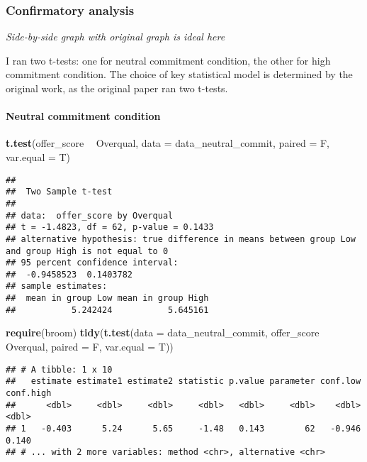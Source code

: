 \documentclass[]{article}
\newenvironment{Shaded}{\begin{snugshade}}{\end{snugshade}}
\newcommand{\DataTypeTok}[1]{\textcolor[rgb]{0.13,0.29,0.53}{#1}}
\newcommand{\KeywordTok}[1]{\textcolor[rgb]{0.13,0.29,0.53}{\textbf{#1}}}
\newcommand{\NormalTok}[1]{#1}
\newcommand{\OperatorTok}[1]{\textcolor[rgb]{0.81,0.36,0.00}{\textbf{#1}}}
\newcommand{\StringTok}[1]{\textcolor[rgb]{0.31,0.60,0.02}{#1}}
\let\oldparagraph\paragraph
\renewcommand{\paragraph}[1]{\oldparagraph{#1}\mbox{}}
\begin{document}
\hypertarget{confirmatory-analysis}{%
\subsubsection{Confirmatory analysis}\label{confirmatory-analysis}}

\emph{Side-by-side graph with original graph is ideal here}

I ran two t-tests: one for neutral commitment condition, the other for
high commitment condition. The choice of key statistical model is
determined by the original work, as the original paper ran two t-tests.

\hypertarget{neutral-commitment-condition}{%
\paragraph{Neutral commitment
condition}\label{neutral-commitment-condition}}

\begin{Shaded}
\begin{Highlighting}[]
\KeywordTok{t.test}\NormalTok{(offer_score }\OperatorTok{~}\StringTok{ }\NormalTok{Overqual, }\DataTypeTok{data =}\NormalTok{ data_neutral_commit, }\DataTypeTok{paired =}\NormalTok{ F, }\DataTypeTok{var.equal =}\NormalTok{ T)}
\end{Highlighting}
\end{Shaded}

\begin{verbatim}
## 
##  Two Sample t-test
## 
## data:  offer_score by Overqual
## t = -1.4823, df = 62, p-value = 0.1433
## alternative hypothesis: true difference in means between group Low and group High is not equal to 0
## 95 percent confidence interval:
##  -0.9458523  0.1403782
## sample estimates:
##  mean in group Low mean in group High 
##           5.242424           5.645161
\end{verbatim}

\begin{Shaded}
\begin{Highlighting}[]
\KeywordTok{require}\NormalTok{(broom)}
\KeywordTok{tidy}\NormalTok{(}\KeywordTok{t.test}\NormalTok{(}\DataTypeTok{data =}\NormalTok{ data_neutral_commit, offer_score }\OperatorTok{~}\StringTok{ }\NormalTok{Overqual, }\DataTypeTok{paired =}\NormalTok{ F, }\DataTypeTok{var.equal =}\NormalTok{ T))}
\end{Highlighting}
\end{Shaded}

\begin{verbatim}
## # A tibble: 1 x 10
##   estimate estimate1 estimate2 statistic p.value parameter conf.low conf.high
##      <dbl>     <dbl>     <dbl>     <dbl>   <dbl>     <dbl>    <dbl>     <dbl>
## 1   -0.403      5.24      5.65     -1.48   0.143        62   -0.946     0.140
## # ... with 2 more variables: method <chr>, alternative <chr>
\end{verbatim}
\end{document}
